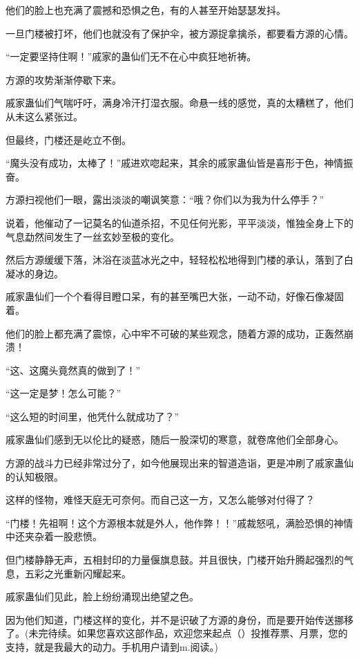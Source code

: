 \begin{this_body}
他们的脸上也充满了震撼和恐惧之色，有的人甚至开始瑟瑟发抖。

一旦门楼被打坏，他们也就没有了保护伞，被方源捉拿擒杀，都要看方源的心情。

“一定要坚持住啊！”戚家的蛊仙们无不在心中疯狂地祈祷。

方源的攻势渐渐停歇下来。

戚家蛊仙们气喘吁吁，满身冷汗打湿衣服。命悬一线的感觉，真的太糟糕了，他们从未这么紧张过。

但最终，门楼还是屹立不倒。

“魔头没有成功，太棒了！”戚进欢唿起来，其余的戚家蛊仙皆是喜形于色，神情振奋。

方源扫视他们一眼，露出淡淡的嘲讽笑意：“哦？你们以为我为什么停手？”

说着，他催动了一记莫名的仙道杀招，不见任何光影，平平淡淡，惟独全身上下的气息勐然间发生了一丝玄妙至极的变化。

然后方源缓缓下落，沐浴在淡蓝冰光之中，轻轻松松地得到门楼的承认，落到了白凝冰的身边。

戚家蛊仙们一个个看得目瞪口呆，有的甚至嘴巴大张，一动不动，好像石像凝固着。

他们的脸上都充满了震惊，心中牢不可破的某些观念，随着方源的成功，正轰然崩溃！

“这、这魔头竟然真的做到了！”

“这一定是梦！怎么可能？”

“这么短的时间里，他凭什么就成功了？”

戚家蛊仙们感到无以伦比的疑惑，随后一股深切的寒意，就卷席他们全部身心。

方源的战斗力已经非常过分了，如今他展现出来的智道造诣，更是冲刷了戚家蛊仙的认知极限。

这样的怪物，难怪天庭无可奈何。而自己这一方，又怎么能够对付得了？

“门楼！先祖啊！这个方源根本就是外人，他作弊！！”戚裁怒吼，满脸恐惧的神情中还夹杂着一股悲愤。

但门楼静静无声，五相封印的力量偃旗息鼓。并且很快，门楼开始升腾起强烈的气息，五彩之光重新闪耀起来。

戚家蛊仙们见此，脸上纷纷涌现出绝望之色。

因为他们知道，门楼这样的变化，并不是识破了方源的身份，而是要开始传送挪移了。(未完待续。如果您喜欢这部作品，欢迎您来起点（）投推荐票、月票，您的支持，就是我最大的动力。手机用户请到m.阅读。)

\end{this_body}

